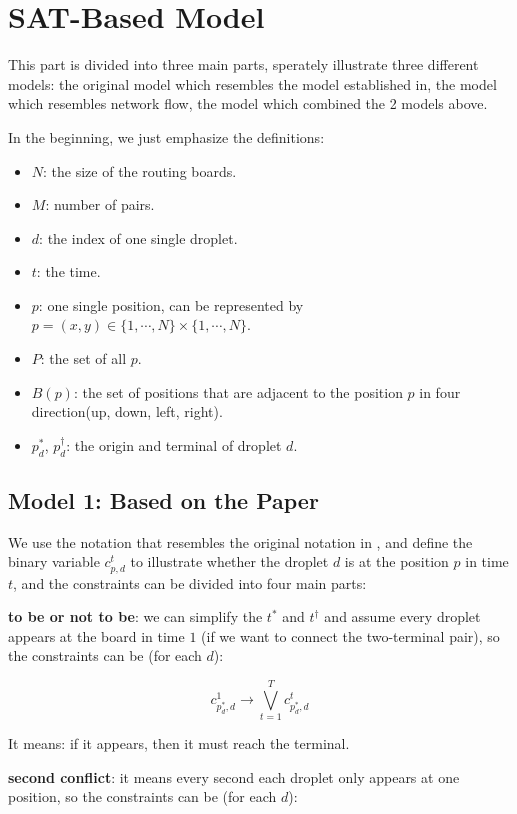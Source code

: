 \documentclass[twocolumn]{article}
\begin{document}
\section{SAT-Based Model}

This part is divided into three main parts, sperately illustrate three different models: the original model which resembles the model established in\cite{source1}, the model which resembles network flow, the model which combined the 2 models above.

In the beginning, we just emphasize the definitions:

\begin{itemize}
	\item $N$: the size of the routing boards.
	\item $M$: number of pairs.
	\item $d$: the index of one single droplet.
	\item $t$: the time.
	\item $p$: one single position, can be represented by $p = (x, y) \in \{1, \cdots, N\} \times \{1, \cdots, N\}$.
	\item $P$: the set of all $p$.
	\item $B(p)$: the set of positions that are adjacent to the position $p$ in four direction(up, down, left, right).
	\item $p^*_d$, $p^\dagger_d$: the origin and terminal of droplet $d$.
\end{itemize}

\subsection{Model 1: Based on the Paper}

We use the notation that resembles the original notation in \cite{source1}, and define the binary variable $c_{p,d}^t$ to illustrate whether the droplet $d$ is at the position $p$ in time $t$, and the constraints can be divided into four main parts:

\textbf{to be or not to be}: we can simplify the $t^*$ and $t^\dagger$ and assume every droplet appears at the board in time $1$ (if we want to connect the two-terminal pair), so the constraints can be (for each $d$):

\[
 c_{p^*_d,d}^1 \to \bigvee_{t=1}^{T} c_{p^*_d, d}^t
\]

It means: if it appears, then it must reach the terminal.

\textbf{second conflict}: it means every second each droplet only appears at one position, so the constraints can be (for each $d$):
\end{document}
